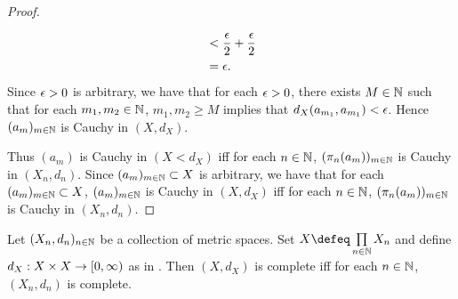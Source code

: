 \documentclass{book}
\begin{document}
\begin{proof}
\begin{itemize}
\begin{align*}
			& < \frac{\epsilon}{2} + \frac{\epsilon}{2} \\
			& = \epsilon.
		\end{align*}
		Since $\epsilon > 0$ is arbitrary, we have that for each $\epsilon >0$, there exists $M \in \mathbb{N}$ such that for each $m_1, m_2 \in \mathbb{N}$, $m_1, m_2 \geq M$ implies that $d_X(a_{m_1}, a_{m_1}) < \epsilon$. Hence $(a_m)_{m \in \mathbb{N}}$ is Cauchy in $(X, d_X)$.
	\end{itemize}
	Thus $(a_m)$ is Cauchy in $(X< d_X)$ iff for each $n \in \mathbb{N}$, $(\pi_n(a_m))_{m \in \mathbb{N}}$ is Cauchy in $(X_n, d_n)$. Since $(a_m)_{m \in \mathbb{N}} \subset X$ is arbitrary, we have that for each $(a_m)_{m \in \mathbb{N}} \subset X$, $(a_m)_{m \in \mathbb{N}}$ is Cauchy in $(X, d_X)$ iff for each $n \in \mathbb{N}$, $(\pi_n(a_m))_{m \in \mathbb{N}}$ is Cauchy in $(X_n, d_n)$.
\end{proof}

\begin{ex} 
	Let $(X_n, d_n)_{n \in \mathbb{N}}$ be a collection of metric spaces. Set $X \defeq \prod\limits_{n \in \N} X_n$ and define $d_X: X \times X \rightarrow [0,\infty)$ as in . Then $(X, d_X)$ is complete iff for each $n \in \mathbb{N}$, $(X_n, d_n)$ is complete. 
\end{ex}
\end{document}
